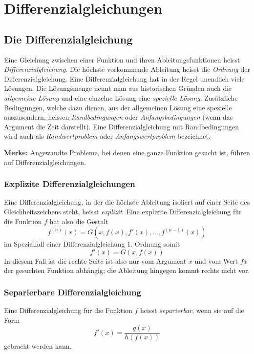 \section{Differenzialgleichungen}


\subsection{Die Differenzialgleichung}

Eine Gleichung zwischen einer Funktion und ihren Ableitungsfunktionen heisst
\emph{Differenzialgleichung}. Die höchste vorkommende Ableitung heisst die
\emph{Ordnung} der Differenzialgleichung. Eine Differenzialgleichung hat in der
Regel unendlich viele Lösungen. Die Lösungsmenge nennt man aus historischen
Gründen auch die \emph{allgemeine Lösung} und eine einzelne Lösung eine
\emph{spezielle Lösung}.  Zusätzliche Bedingungen, welche dazu dienen, aus der
allgemeinen Lösung eine spezielle auszusondern, heissen \emph{Randbedingungen}
oder \emph{Anfangsbedingungen} (wenn das Argument die Zeit darstellt). Eine
Differenzialgleichung mit Randbedingungen wird auch als \emph{Randwertproblem}
oder \emph{Anfangswertproblem} bezeichnet.

\textbf{Merke:} Angewandte Probleme, bei denen eine ganze Funktion gesucht ist,
führen auf Differenzialgleichungen.


\subsubsection{Explizite Differenzialgleichungen}

Eine Differenzialgleichung, in der die höchste Ableitung isoliert auf einer
Seite des Gleichheitszeichens steht, heisst \emph{explizit}. Eine explizite
Differenzialgleichung für die Funktion $f$ hat also die Gestalt
$$f^{(n)}(x) = G\left(x,f(x),f'(x),\dotsc,f^{(n-1)}(x)\right)$$
im Spezialfall einer Differenzialgleichung 1. Ordnung somit
$$f'(x) = G(x,f(x))$$
In diesem Fall ist die rechte Seite ist also nur vom Argument $x$ und vom Wert
$fx$ der gesuchten Funktion abhängig; die Ableitung hingegen kommt rechts nicht
vor.


\subsubsection{Separierbare Differenzialgleichung}

Eine Differenzialgleichung für die Funktion $f$ heisst \emph{separierbar}, wenn
sie auf die Form
$$f'(x) = \frac{g(x)}{h(f(x))}$$
gebracht werden kann.


